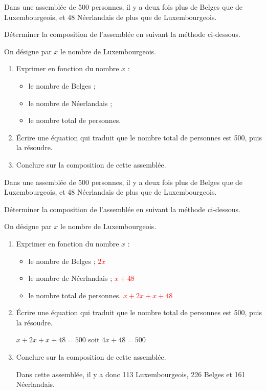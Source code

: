 \begin{exercice*}
    Dans une assemblée de 500 personnes, il y a deux fois plus de Belges que de Luxembourgeois, 
    et 48 Néerlandais de plus que de Luxembourgeois. 
    
    Déterminer la composition de l'assemblée en suivant la méthode ci-dessous. 
    
    On désigne par $x$ le nombre de Luxembourgeois.

    \begin{enumerate}
        \item Exprimer en fonction du nombre $x$ :
        \begin{itemize}
            \item le nombre de Belges ;
            \item le nombre de Néerlandais ;
            \item le nombre total de personnes.
        \end{itemize}
        \item Écrire une équation qui traduit que le nombre total de personnes est 500, puis la résoudre.
        \item Conclure sur la composition de cette assemblée.
    \end{enumerate}
\end{exercice*}
\begin{corrige}
    Dans une assemblée de 500 personnes, il y a deux fois plus de Belges que de Luxembourgeois, 
    et 48 Néerlandais de plus que de Luxembourgeois. 
    
    Déterminer la composition de l'assemblée en suivant la méthode ci-dessous. 
    
    On désigne par $x$ le nombre de Luxembourgeois.

    \begin{enumerate}
        \item Exprimer en fonction du nombre $x$ :
        \begin{itemize}
            \item le nombre de Belges ; \textcolor{red}{$2x$}
            \item le nombre de Néerlandais ; \textcolor{red}{$x+48$}
            \item le nombre total de personnes. \textcolor{red}{$x+2x+x+48$}
        \end{itemize}
        \item Écrire une équation qui traduit que le nombre total de personnes est 500, puis la résoudre.
        
        {\color{red} $x+2x+x+48=500$ soit $4x+48=500$
        
        }
        \item Conclure sur la composition de cette assemblée.
        
        {\color{red} Dans cette assemblée, il y a donc 113 Luxembourgeois, 226 Belges et 161 Néerlandais.}
    \end{enumerate}
\end{corrige}

